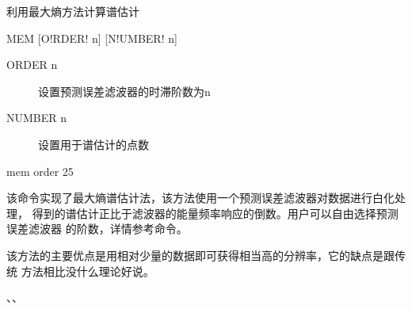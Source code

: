 \label{spe:mem}

利用最大熵方法计算谱估计

\begin{SACSTX}
MEM [O!RDER! n] [N!UMBER! n]
\end{SACSTX}

\begin{description}
\item [ORDER n] 设置预测误差滤波器的时滞阶数为n
\item [NUMBER n] 设置用于谱估计的点数
\end{description}

\begin{SACDFT}
mem order 25
\end{SACDFT}

该命令实现了最大熵谱估计法，该方法使用一个预测误差滤波器对数据进行白化处理，
得到的谱估计正比于滤波器的能量频率响应的倒数。用户可以自由选择预测误差滤波器
的阶数，详情参考命令。

该方法的主要优点是用相对少量的数据即可获得相当高的分辨率，它的缺点是跟传统
方法相比没什么理论好说。

、、
